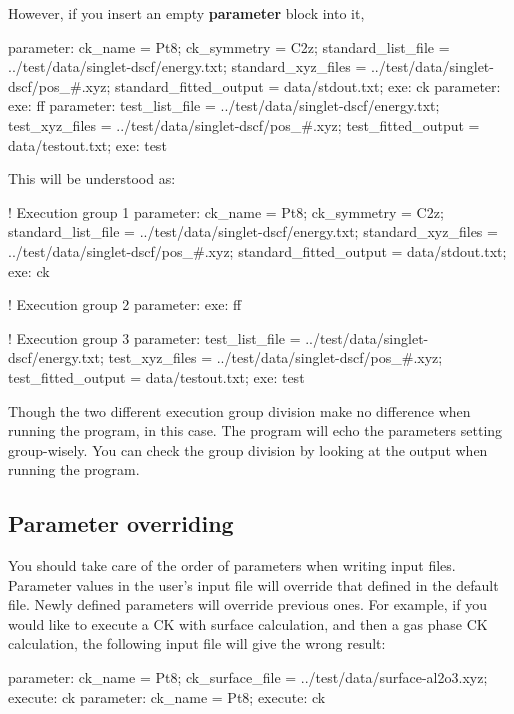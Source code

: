 \documentclass[11pt]{book}
\begin{document}
However, if you insert an empty \textbf{parameter} block into it, 

\begin{everbatim}
{ parameter:
 ck_name = Pt8;
 ck_symmetry = C2z;
 standard_list_file     = ../test/data/singlet-dscf/energy.txt;
 standard_xyz_files     = ../test/data/singlet-dscf/pos_#.xyz;
 standard_fitted_output = data/stdout.txt;
}
{ exe: ck }
{ parameter: }
{ exe: ff }
{ parameter:
 test_list_file     = ../test/data/singlet-dscf/energy.txt;
 test_xyz_files     = ../test/data/singlet-dscf/pos_#.xyz;
 test_fitted_output = data/testout.txt;
}
{exe: test }
\end{everbatim}

This will be understood as:

\begin{everbatim}

! Execution group 1
  { parameter:
   ck_name = Pt8;
   ck_symmetry = C2z;
   standard_list_file     = ../test/data/singlet-dscf/energy.txt;
   standard_xyz_files     = ../test/data/singlet-dscf/pos_#.xyz;
   standard_fitted_output = data/stdout.txt;
  }
  { exe: ck }

! Execution group 2
  { parameter: }
  { exe: ff }

! Execution group 3
  { parameter:
   test_list_file     = ../test/data/singlet-dscf/energy.txt;
   test_xyz_files     = ../test/data/singlet-dscf/pos_#.xyz;
   test_fitted_output = data/testout.txt;
  }
  { exe: test }
\end{everbatim}

Though the two different execution group division make no difference when running the program, in this case.
The program will echo the parameters setting group-wisely. You can check the group division by looking 
at the output when running the program.

\subsection{Parameter overriding}

You should take care of the order of parameters when writing input files. Parameter values in the user's input file 
will override that defined in the default file. Newly defined parameters will override previous ones. For example, 
if you would like to execute a CK with surface calculation, and then a gas phase CK calculation, the following 
input file will give the wrong result:

\begin{everbatim}
{ parameter: 
   ck_name = Pt8;
   ck_surface_file = ../test/data/surface-al2o3.xyz;
}
{ execute: ck }
{ parameter: ck_name = Pt8; }
{ execute: ck }
\end{everbatim}
\end{document}
